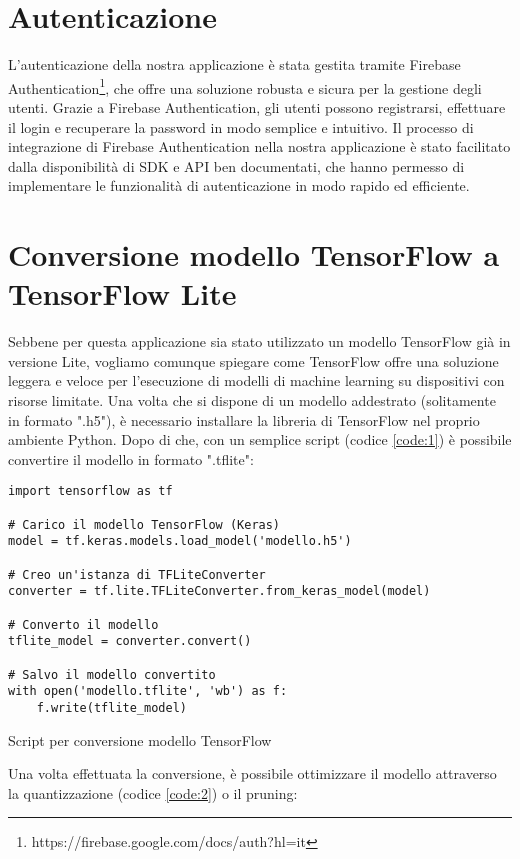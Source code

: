 \newpage
\section{Autenticazione}
L'autenticazione della nostra applicazione è stata gestita tramite Firebase Authentication\footnote{https://firebase.google.com/docs/auth?hl=it}, che
offre una soluzione robusta e sicura per la gestione degli utenti. Grazie a Firebase Authentication, gli utenti possono registrarsi, effettuare il login
e recuperare la password in modo semplice e intuitivo. Il processo di integrazione di Firebase Authentication nella nostra applicazione è stato facilitato
dalla disponibilità di SDK e API ben documentati, che hanno permesso di implementare le funzionalità di autenticazione in modo rapido ed efficiente.


\section{Conversione modello TensorFlow a TensorFlow Lite}
Sebbene per questa applicazione sia stato utilizzato un modello TensorFlow già in versione Lite, vogliamo comunque spiegare come TensorFlow offre una
soluzione leggera e veloce per l'esecuzione di modelli di machine learning su dispositivi con risorse limitate. Una volta che si dispone di un modello
addestrato (solitamente in formato ".h5"), è necessario installare la libreria di TensorFlow nel proprio ambiente Python. Dopo di che, con un semplice 
script (codice \ref{code:1}) è possibile convertire il modello in formato ".tflite":

\begin{code}
\begin{verbatim}
import tensorflow as tf
    
# Carico il modello TensorFlow (Keras)
model = tf.keras.models.load_model('modello.h5')

# Creo un'istanza di TFLiteConverter
converter = tf.lite.TFLiteConverter.from_keras_model(model)

# Converto il modello
tflite_model = converter.convert()

# Salvo il modello convertito
with open('modello.tflite', 'wb') as f:
    f.write(tflite_model)
\end{verbatim}
\caption{Script per conversione modello TensorFlow}
\label{code:1}
\end{code}
\bigskip

Una volta effettuata la conversione, è possibile ottimizzare il modello attraverso la quantizzazione (codice \ref{code:2}) o il pruning:

